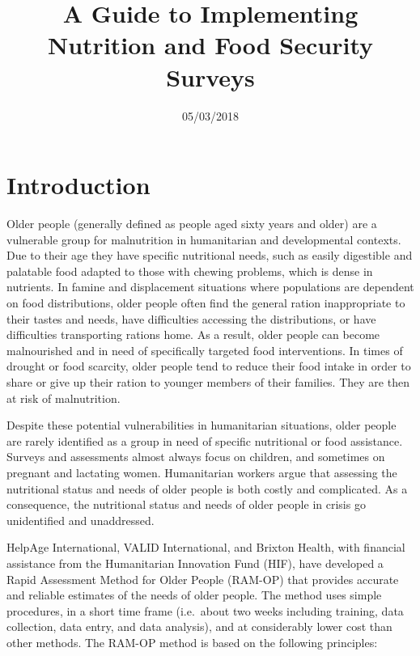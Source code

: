 \documentclass[12pt,]{book}
\title{A Guide to Implementing Nutrition and Food Security Surveys}
\author{}
\date{05/03/2018}
\theoremstyle{definition}
\theoremstyle{definition}
\theoremstyle{definition}
\theoremstyle{remark}
\begin{document}
\maketitle

{
\setcounter{tocdepth}{1}
\tableofcontents
}
\hypertarget{introduction}{%
\chapter{Introduction}\label{introduction}}

Older people (generally defined as people aged sixty years and older)
are a vulnerable group for malnutrition in humanitarian and
developmental contexts. Due to their age they have specific nutritional
needs, such as easily digestible and palatable food adapted to those
with chewing problems, which is dense in nutrients. In famine and
displacement situations where populations are dependent on food
distributions, older people often find the general ration inappropriate
to their tastes and needs, have difficulties accessing the
distributions, or have difficulties transporting rations home. As a
result, older people can become malnourished and in need of specifically
targeted food interventions. In times of drought or food scarcity, older
people tend to reduce their food intake in order to share or give up
their ration to younger members of their families. They are then at risk
of malnutrition.

Despite these potential vulnerabilities in humanitarian situations,
older people are rarely identified as a group in need of specific
nutritional or food assistance. Surveys and assessments almost always
focus on children, and sometimes on pregnant and lactating women.
Humanitarian workers argue that assessing the nutritional status and
needs of older people is both costly and complicated. As a consequence,
the nutritional status and needs of older people in crisis go
unidentified and unaddressed.

HelpAge International, VALID International, and Brixton Health, with
financial assistance from the Humanitarian Innovation Fund (HIF), have
developed a Rapid Assessment Method for Older People (RAM-OP) that
provides accurate and reliable estimates of the needs of older people.
The method uses simple procedures, in a short time frame (i.e.~about two
weeks including training, data collection, data entry, and data
analysis), and at considerably lower cost than other methods. The RAM-OP
method is based on the following principles:
\end{document}
